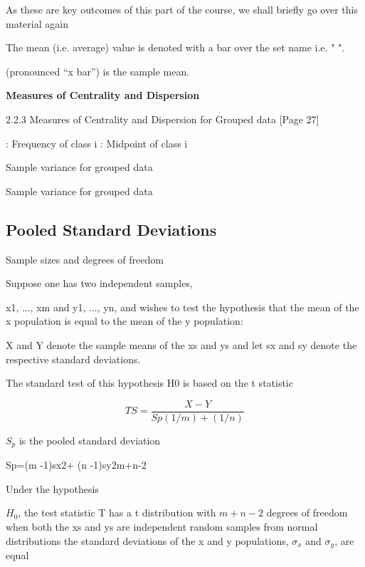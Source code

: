 As these are key outcomes of this part of the course, we shall briefly go over this material again 

The mean (i.e. average) value is denoted with a bar over the set name i.e. " ".


(pronounced “x bar”)  is the sample mean.



\textbf{Measures of Centrality and Dispersion}


2.2.3 Measures of Centrality and Dispersion for Grouped data
[Page 27]

: Frequency of class i
: Midpoint of class i

Sample variance for grouped data



Sample variance for grouped data










\subsection{Pooled Standard Deviations}

Sample sizes and degrees of freedom


Suppose one has two independent samples,

x1, ..., xm and y1, ..., yn, and wishes
to test the hypothesis that the mean of the
x population is equal to the mean
of the y population:




X and Y denote the sample means of the xs and ys and let sx and sy
denote the respective standard deviations.

The standard test of this hypothesis
H0 is based on the t statistic

\[TS =\frac{X-Y}{Sp(1/m )+ (1/n)}\]


$S_p$ is the pooled standard deviation


Sp=(m -1)sx2+ (n -1)sy2m+n-2

Under the hypothesis

$H_0$, the test statistic T has a t distribution with $m+n−2$
degrees of freedom when both the xs and ys are independent random samples from normal distributions the standard deviations of the x and y populations, $\sigma_x$ and $\sigma_y$, are equal

